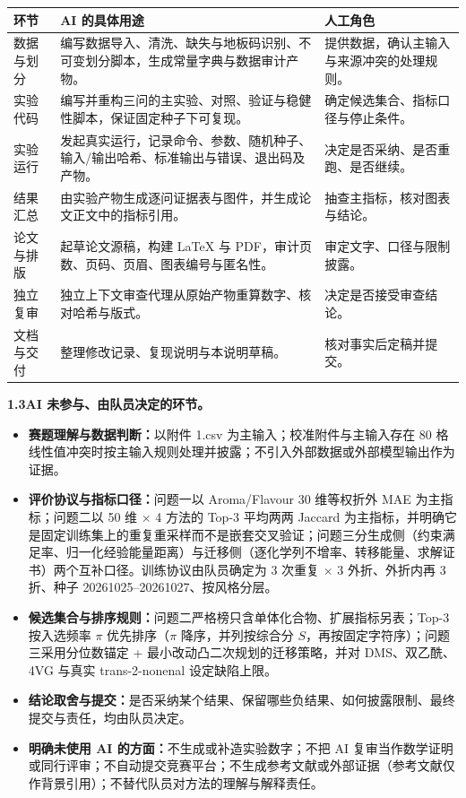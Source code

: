\documentclass[11pt,a4paper]{article}
\renewcommand{\arraystretch}{1.12}
\begin{document}
\begin{center}
\begin{minipage}{\linewidth}
\centering
\renewcommand{\arraystretch}{1.04}
\footnotesize
\begin{tabular}{@{}p{2.7cm}p{8.1cm}p{4.5cm}@{}}
\toprule
环节 & AI 的具体用途 & 人工角色 \\
\midrule
数据与划分 & 编写数据导入、清洗、缺失与地板码识别、不可变划分脚本，生成常量字典与数据审计产物。 & 提供数据，确认主输入与来源冲突的处理规则。 \\
实验代码 & 编写并重构三问的主实验、对照、验证与稳健性脚本，保证固定种子下可复现。 & 确定候选集合、指标口径与停止条件。 \\
实验运行 & 发起真实运行，记录命令、参数、随机种子、输入/输出哈希、标准输出与错误、退出码及产物。 & 决定是否采纳、是否重跑、是否继续。 \\
结果汇总 & 由实验产物生成逐问证据表与图件，并生成论文正文中的指标引用。 & 抽查主指标，核对图表与结论。 \\
论文与排版 & 起草论文源稿，构建 LaTeX 与 PDF，审计页数、页码、页眉、图表编号与匿名性。 & 审定文字、口径与限制披露。 \\
独立复审 & 独立上下文审查代理从原始产物重算数字、核对哈希与版式。 & 决定是否接受审查结论。 \\
文档与交付 & 整理修改记录、复现说明与本说明草稿。 & 核对事实后定稿并提交。 \\
\bottomrule
\end{tabular}
\end{minipage}
\end{center}

\textbf{1.3\quad AI 未参与、由队员决定的环节。}
\begin{itemize}
\item \textbf{赛题理解与数据判断：}以附件 1.csv 为主输入；校准附件与主输入存在 80 格线性值冲突时按主输入规则处理并披露；不引入外部数据或外部模型输出作为证据。
\item \textbf{评价协议与指标口径：}问题一以 Aroma/Flavour 30 维等权折外 MAE 为主指标；问题二以 50 维 × 4 方法的 Top-3 平均两两 Jaccard 为主指标，并明确它是固定训练集上的重复重采样而不是嵌套交叉验证；问题三分生成侧（约束满足率、归一化经验能量距离）与迁移侧（逐化学列不增率、转移能量、求解证书）两个互补口径。训练协议由队员确定为 3 次重复 × 3 外折、外折内再 3 折、种子 20261025--20261027、按风格分层。
\item \textbf{候选集合与排序规则：}问题二严格榜只含单体化合物、扩展指标另表；Top-3 按入选频率 $\pi$ 优先排序（$\pi$ 降序，并列按综合分 $S$，再按固定字符序）；问题三采用分位数锚定 + 最小改动凸二次规划的迁移策略，并对 DMS、双乙酰、4VG 与真实 trans-2-nonenal 设定缺陷上限。
\item \textbf{结论取舍与提交：}是否采纳某个结果、保留哪些负结果、如何披露限制、最终提交与责任，均由队员决定。
\item \textbf{明确未使用 AI 的方面：}不生成或补造实验数字；不把 AI 复审当作数学证明或同行评审；不自动提交竞赛平台；不生成参考文献或外部证据（参考文献仅作背景引用）；不替代队员对方法的理解与解释责任。
\end{itemize}
\end{document}
